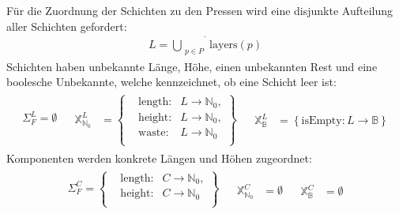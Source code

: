 Für die Zuordnung der Schichten zu den Pressen wird eine disjunkte Aufteilung aller Schichten gefordert:
\begin{align}
    L = \dot{\bigcup_{\substack{p \in P}}} \text{layers}(p) \label{constraint:disjointLayers}
\end{align}
Schichten haben unbekannte Länge, Höhe, einen unbekannten Rest und eine boolesche Unbekannte, welche kennzeichnet, ob eine Schicht leer ist:
\[
    \begin{array}{lll}
        \begin{aligned}
            \Sigma_{F}^{L} = \emptyset \\[5pt]
        \end{aligned}
        &
        \begin{aligned}
            \mathbb{X}_{\mathbb{N}_0}^{L} &= \left\{
            \begin{aligned}
                & \text{length}: & L \rightarrow \mathbb{N}_0, \\
                & \text{height}: & L \rightarrow \mathbb{N}_0, \\
                & \text{waste}: & L \rightarrow \mathbb{N}_0 \; \\
            \end{aligned} \right\}
        \end{aligned}
        &
        \begin{aligned}
            \mathbb{X}_{\mathbb{B}}^{L} &= \left\{ \text{isEmpty}: L \rightarrow \mathbb{B} \right\}
        \end{aligned}
    \end{array}
\]
Komponenten werden konkrete Längen und Höhen zugeordnet:
\[
    \begin{array}{lll}
        \begin{aligned}
            \Sigma_{F}^{C} = \left\{
            \begin{aligned}
                & \text{length}: & C \rightarrow \mathbb{N}_0, \\
                & \text{height}: & C \rightarrow \mathbb{N}_0 \; \\
            \end{aligned} \right\} \\[5pt]
        \end{aligned}
        &
        \begin{aligned}
            \mathbb{X}_{\mathbb{N}_0}^{C} &= \emptyset
        \end{aligned}
        &
        \begin{aligned}
            \mathbb{X}_{\mathbb{B}}^{C} &= \emptyset
        \end{aligned}
    \end{array}
\]
